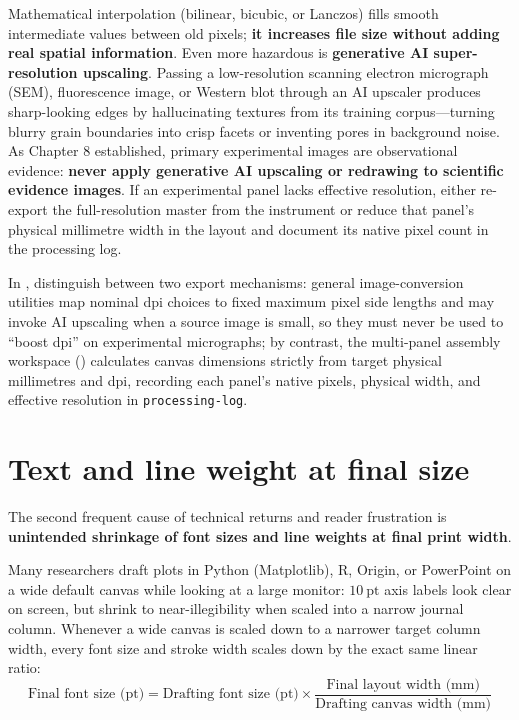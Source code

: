 Mathematical interpolation (bilinear, bicubic, or Lanczos) fills smooth intermediate values between old pixels; \textbf{it increases file size without adding real spatial information}. Even more hazardous is \textbf{generative AI super-resolution upscaling}. Passing a low-resolution scanning electron micrograph (SEM), fluorescence image, or Western blot through an AI upscaler produces sharp-looking edges by hallucinating textures from its training corpus---turning blurry grain boundaries into crisp facets or inventing pores in background noise. As Chapter 8 established, primary experimental images are observational evidence: \textbf{never apply generative AI upscaling or redrawing to scientific evidence images}. If an experimental panel lacks effective resolution, either re-export the full-resolution master from the instrument or reduce that panel's physical millimetre width in the layout and document its native pixel count in the processing log.

In \scidraw{}, distinguish between two export mechanisms: general image-conversion utilities map nominal dpi choices to fixed maximum pixel side lengths and may invoke AI upscaling when a source image is small, so they must never be used to ``boost dpi'' on experimental micrographs; by contrast, the multi-panel assembly workspace () calculates canvas dimensions strictly from target physical millimetres and dpi, recording each panel's native pixels, physical width, and effective resolution in \texttt{processing-log}.

\section{Text and line weight at final size}

The second frequent cause of technical returns and reader frustration is \textbf{unintended shrinkage of font sizes and line weights at final print width}.

Many researchers draft plots in Python (Matplotlib), R, Origin, or PowerPoint on a wide default canvas while looking at a large monitor: $10\ \text{pt}$ axis labels look clear on screen, but shrink to near-illegibility when scaled into a narrow journal column. Whenever a wide canvas is scaled down to a narrower target column width, every font size and stroke width scales down by the exact same linear ratio:
\[
\text{Final font size (pt)} = \text{Drafting font size (pt)} \times \frac{\text{Final layout width (mm)}}{\text{Drafting canvas width (mm)}}
\]


